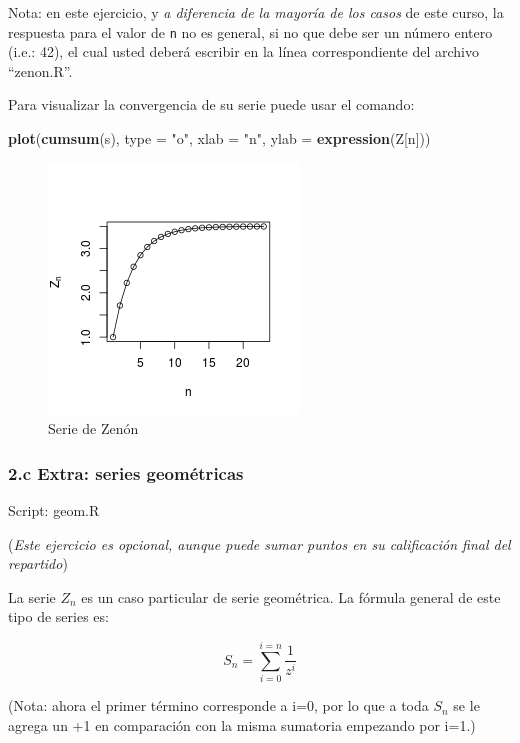 \documentclass[]{article}
\makeatletter
\newenvironment{Shaded}{}{}
\newcommand{\KeywordTok}[1]{\textcolor[rgb]{0.00,0.44,0.13}{\textbf{{#1}}}}
\newcommand{\DataTypeTok}[1]{\textcolor[rgb]{0.56,0.13,0.00}{{#1}}}
\newcommand{\StringTok}[1]{\textcolor[rgb]{0.25,0.44,0.63}{{#1}}}
\newcommand{\NormalTok}[1]{{#1}}
\def\maxwidth{\ifdim\Gin@nat@width>\linewidth\linewidth
\else\Gin@nat@width\fi}
\let\Oldincludegraphics\includegraphics
\renewcommand{\includegraphics}[1]{\Oldincludegraphics[width=\maxwidth]{#1}}
\makeatother
\begin{document}
Nota: en este ejercicio, y \emph{a diferencia de la mayoría de los
casos} de este curso, la respuesta para el valor de \texttt{n} no es
general, si no que debe ser un número entero (i.e.: 42), el cual usted
deberá escribir en la línea correspondiente del archivo ``zenon.R''.

Para visualizar la convergencia de su serie puede usar el comando:

\begin{Shaded}
\begin{Highlighting}[]
\KeywordTok{plot}\NormalTok{(}\KeywordTok{cumsum}\NormalTok{(s), }\DataTypeTok{type =} \StringTok{"o"}\NormalTok{, }\DataTypeTok{xlab =} \StringTok{"n"}\NormalTok{, }\DataTypeTok{ylab =} \KeywordTok{expression}\NormalTok{(Z[n]))}
\end{Highlighting}
\end{Shaded}
\begin{figure}[htbp]
\centering
\includegraphics{figure/unnamed-chunk-15.png}
\caption{Serie de Zenón}
\end{figure}

\subsubsection{2.c Extra: series geométricas}

Script: geom.R

(\emph{Este ejercicio es opcional, aunque puede sumar puntos en su
calificación final del repartido})

La serie $Z_n$ es un caso particular de serie geométrica. La fórmula
general de este tipo de series es:

\[
  S_n = \sum_{i=0}^{i=n} \frac{1}{z ^ i}
\]

(Nota: ahora el primer término corresponde a i=0, por lo que a toda
$S_n$ se le agrega un +1 en comparación con la misma sumatoria empezando
por i=1.)
\end{document}
